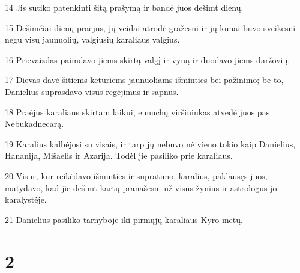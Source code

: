 \par 14 Jis sutiko patenkinti šitą prašymą ir bandė juos dešimt dienų. 
\par 15 Dešimčiai dienų praėjus, jų veidai atrodė gražesni ir jų kūnai buvo sveikesni negu visų jaunuolių, valgiusių karaliaus valgius. 
\par 16 Prievaizdas paimdavo jiems skirtą valgį ir vyną ir duodavo jiems daržovių. 
\par 17 Dievas davė šitiems keturiems jaunuoliams išminties bei pažinimo; be to, Danielius suprasdavo visus regėjimus ir sapnus. 
\par 18 Praėjus karaliaus skirtam laikui, eunuchų viršininkas atvedė juos pas Nebukadnecarą. 
\par 19 Karalius kalbėjosi su visais, ir tarp jų nebuvo nė vieno tokio kaip Danielius, Hananija, Mišaelis ir Azarija. Todėl jie pasiliko prie karaliaus. 
\par 20 Visur, kur reikėdavo išminties ir supratimo, karalius, paklausęs juos, matydavo, kad jie dešimt kartų pranašesni už visus žynius ir astrologus jo karalystėje. 
\par 21 Danielius pasiliko tarnyboje iki pirmųjų karaliaus Kyro metų.


\chapter{2}


